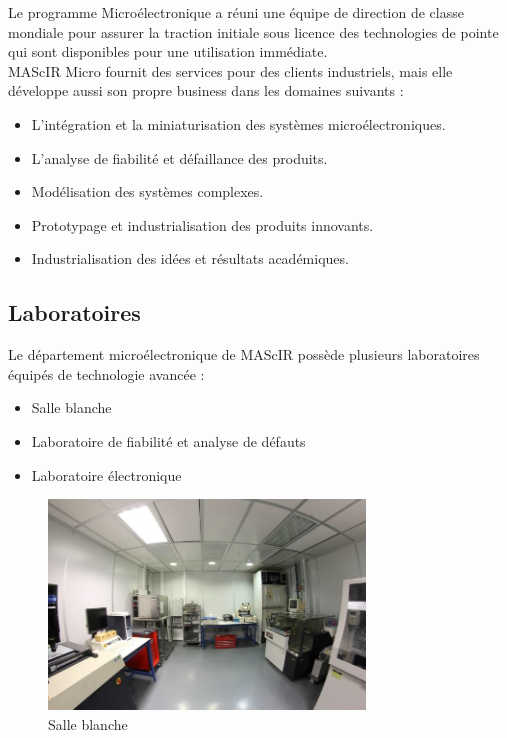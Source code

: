 \documentclass[11pt, a4paper, twoside]{book}
\begin{document}
Le programme Microélectronique a réuni une équipe de direction de classe mondiale pour assurer la traction initiale sous licence des technologies de pointe qui sont disponibles pour une utilisation immédiate. \\

MAScIR Micro fournit des services pour des clients industriels, mais elle développe aussi son propre business dans les domaines suivants :
\begin{itemize}
\item L’intégration et la miniaturisation des systèmes microélectroniques.
\item L’analyse de fiabilité et défaillance des produits.
\item Modélisation des systèmes complexes.
\item Prototypage et industrialisation des produits innovants.
\item Industrialisation des idées et résultats académiques.
\end{itemize}

\subsection{Laboratoires}
Le département microélectronique de MAScIR possède plusieurs laboratoires équipés de technologie avancée :
\begin{itemize}
\item Salle blanche
\item Laboratoire de fiabilité et analyse de défauts
\item Laboratoire électronique
\end{itemize}

\begin{figure}[h!]
\centering
\includegraphics[width=0.75\textwidth]{cleanroom}
\caption{Salle blanche}
\end{figure}
\end{document}
